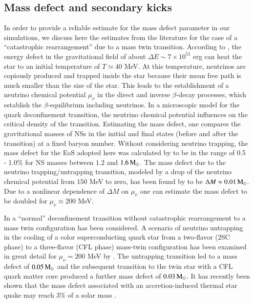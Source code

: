 \documentclass[main.tex]{subfiles}
\begin{document}
    
    
    \subsection{Mass defect and secondary kicks}\label{sec:ch4:mass_defect}
    In order to provide a reliable estimate for the mass defect parameter in our simulations, we discuss here the estimates from the literature for the case of a ``catastrophic rearrangement'' due to a mass twin transition. According to \cite{Mishustin:2002xe}, the energy defect in the gravitational field of about $\Delta E \sim  7 \times 10^{51}$ erg can heat the star to an initial temperature of $T\simeq 40$ MeV. 
    At this temperature, neutrinos are copiously produced and trapped inside the star because their mean free path is much smaller than the size of the star.
    This leads to the establishment of a neutrino chemical potential $\mu_\nu$ in the direct and inverse $\beta$-decay processes, which establish the $\beta$-equilibrium including neutrinos. In a microscopic model for the quark deconfinement transition, the neutrino chemical potential influences on the critical density of the transition. 
    Estimating the mass defect, one compares the gravitational masses of NSs in the initial and final states (before and after the transition) at a fixed baryon number. Without considering neutrino trapping, the mass defect for the EoS adopted here was calculated by \cite{2021AN....342..234A} to be in the range of 0.5 - 1.0\% for NS masses between $1.2$ and $1.6\mathrm{\,M_\odot}$.
    The mass defect due to the neutrino trapping/untrapping transition, modeled by a drop of the neutrino chemical potential from $150$ MeV to zero, has been found by \cite{Aguilera:2002dh} to be $\Delta M \approx 0.01\mathrm{\,M_\odot}$. Due to a nonlinear dependence of $\Delta M$ on $\mu_\nu$ one can estimate the mass defect to be doubled for $\mu_\nu\approx 200$ MeV. 
    
    In \cite{Aguilera:2002dh} a ``normal'' deconfinement transition without catastrophic rearrangement to a mass twin configuration has been considered. 
    A scenario of neutrino untrapping in the cooling of a color superconducting quark star from a two-flavor (2SC phase) to a three-flavor (CFL phase) mass-twin configuration has been examined in great detail for $\mu_\nu = 200$ MeV by \cite{Sandin:2007zr}. The untrapping transition led to a mass defect of $0.05\mathrm{\,M_\odot}$ and the subsequent transition to the twin star with a CFL quark matter core produced a further mass defect of $0.03\mathrm{\,M_\odot}$.
    It has recently been shown that the mass defect associated with an accretion-induced thermal star quake may reach $3\%$ of a solar mass \citep{Carlomagno:2024vvr}.
    
\end{document}
